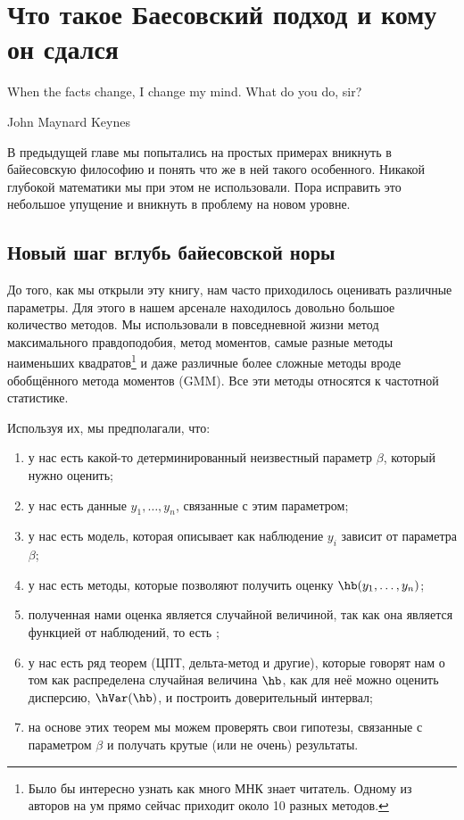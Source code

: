 

\chapter{ Что такое Баесовский подход и кому он сдался }

\epigraph{When the facts change, I change my mind. What do you do, sir?}{John Maynard Keynes}


В предыдущей главе мы попытались на простых примерах вникнуть в байесовскую философию и понять что же в ней такого особенного. Никакой глубокой математики мы при этом не использовали. Пора исправить это небольшое упущение и вникнуть в проблему на новом уровне.

\section{Новый шаг вглубь байесовской норы}

До того, как мы открыли эту книгу, нам часто приходилось оценивать различные параметры. Для этого в нашем арсенале находилось довольно большое количество методов. Мы  использовали в повседневной жизни метод максимального правдоподобия, метод моментов, самые разные методы наименьших квадратов\footnote{Было бы интересно узнать как много МНК знает читатель. Одному из авторов на ум прямо сейчас приходит около 10 разных методов.} и даже различные более сложные методы вроде обобщённого метода моментов (GMM). Все эти методы относятся к частотной статистике.

Используя их, мы предполагали, что:

\begin{enumerate}
\item у нас есть какой-то детерминированный неизвестный параметр $\beta$, который нужно оценить;
\item у  нас есть данные $y_1, \ldots, y_n$, связанные с этим параметром;
\item у нас есть модель, которая описывает как наблюдение $y_i$ зависит от параметра $\beta$;
\item у нас есть методы, которые позволяют получить оценку $\hb(y_1, \ldots, y_n)$;
\item полученная нами оценка является случайной величиной, так как она является функцией от наблюдений, то есть ;
\item у нас есть ряд теорем (ЦПТ, дельта-метод и другие), которые говорят нам о том как распределена случайная величина $\hb$, как для неё можно оценить дисперсию, $\hVar(\hb)$, и построить доверительный интервал;
\item на основе этих теорем мы можем проверять свои гипотезы, связанные с параметром $\beta$ и получать крутые (или не очень)  результаты. 
\end{enumerate}


